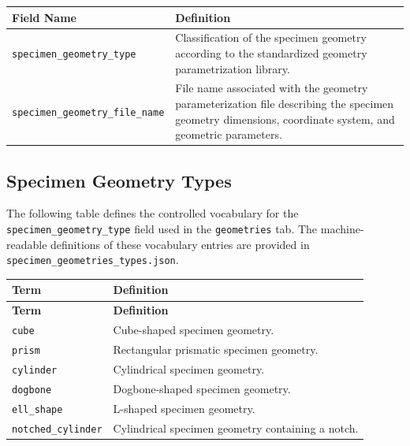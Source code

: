 \documentclass[11pt]{book}
\begin{document}
{\begin{longtable}{p{}p{}}
\hline
\textbf{Field Name} & \textbf{Definition} \\
\hline
\endhead

\texttt{specimen\_geometry\_type} &
Classification of the specimen geometry according to the standardized geometry parametrization library. \\

\texttt{specimen\_geometry\_file\_name} &
File name associated with the geometry parameterization file describing the specimen geometry dimensions, coordinate system, and geometric parameters. \\

\hline
\end{longtable}

\subsection{Specimen Geometry Types}
\label{vocab:specimen_geometry_type_list}

The following table defines the controlled vocabulary for the \texttt{specimen\_geometry\_type} field used in the \texttt{geometries} tab. The machine-readable definitions of these vocabulary entries are provided in \texttt{specimen\_geometries\_types.json}.

\begin{longtable}{p{}p{}}
\hline
\textbf{Term} & \textbf{Definition} \\
\hline
\endfirsthead

\hline
\textbf{Term} & \textbf{Definition} \\
\hline
\endhead

\texttt{cube} &
Cube-shaped specimen geometry. \\

\texttt{prism} &
Rectangular prismatic specimen geometry. \\

\texttt{cylinder} &
Cylindrical specimen geometry. \\

\texttt{dogbone} &
Dogbone-shaped specimen geometry. \\

\texttt{ell\_shape} &
L-shaped specimen geometry. \\

\texttt{notched\_cylinder} &
Cylindrical specimen geometry containing a notch. \\


\end{longtable}}
\end{document}
